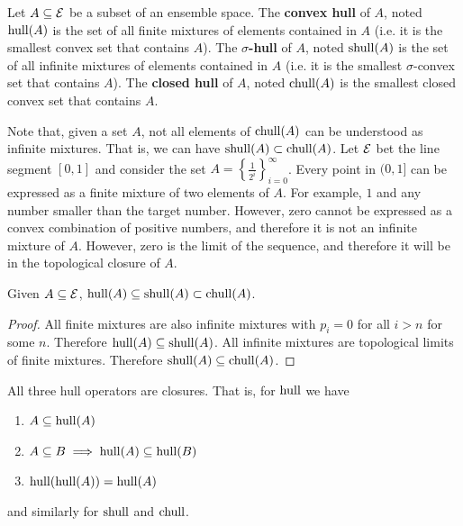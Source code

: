 \begin{mathSection}
\begin{defn}
	Let $A \subseteq \mathcal{E}$ be a subset of an ensemble space. The \textbf{convex hull} of $A$, noted $\mathrm{hull}(A)$ is the set of all finite mixtures of elements contained in $A$ (i.e. it is the smallest convex set that contains $A$). The \textbf{$\sigma$-hull} of $A$, noted $\mathrm{shull}(A)$ is the set of all infinite mixtures of elements contained in $A$ (i.e. it is the smallest $\sigma$-convex set that contains $A$). The \textbf{closed hull} of $A$, noted $\mathrm{chull}(A)$ is the smallest closed convex set that contains $A$. 
\end{defn}

\begin{remark}
	Note that, given a set $A$, not all elements of $\mathrm{chull}(A)$ can be understood as infinite mixtures. That is, we can have $\mathrm{shull}(A) \subset \mathrm{chull}(A)$. Let $\mathcal{E}$ bet the line segment $[0,1]$ and consider the set $A=\left\{\frac{1}{2^i}\right\}_{i=0}^{\infty}$. Every point in $(0,1]$ can be expressed as a finite mixture of two elements of $A$. For example, $1$ and any number smaller than the target number. However, zero cannot be expressed as a convex combination of positive numbers, and therefore it is not an infinite mixture of $A$. However, zero is the limit of the sequence, and therefore it will be in the topological closure of $A$.
\end{remark}

\begin{coro}
	Given $A \subseteq \mathcal{E}$, $\mathrm{hull}(A) \subseteq \mathrm{shull}(A) \subset \mathrm{chull}(A)$.
\end{coro}

\begin{proof}
	All finite mixtures are also infinite mixtures with $p_i = 0$ for all $i > n$ for some $n$. Therefore $\mathrm{hull}(A) \subseteq \mathrm{shull}(A)$. All infinite mixtures are topological limits of finite mixtures. Therefore $\mathrm{shull}(A) \subseteq \mathrm{chull}(A)$. 
\end{proof}

\begin{coro}\label{pm_es_hullProp}
	All three hull operators are closures. That is, for $\mathrm{hull}$ we have
	\begin{enumerate}
		\item $A \subseteq \mathrm{hull}(A)$
		\item $A \subseteq B \implies \mathrm{hull}(A) \subseteq \mathrm{hull}(B)$
		\item $\mathrm{hull}(\mathrm{hull}(A)) = \mathrm{hull}(A)$
	\end{enumerate}
	and similarly for $\mathrm{shull}$ and $\mathrm{chull}$.
\end{coro}


\end{mathSection}
